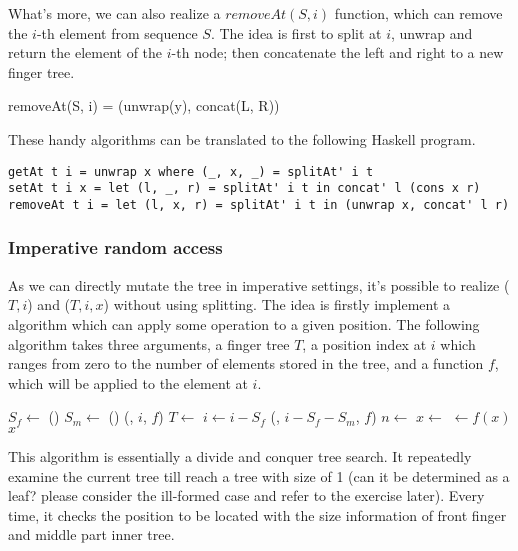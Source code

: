 \documentclass[UTF8]{article}
\begin{document}
What's more, we can also realize a $removeAt(S, i)$ function, which can remove the
$i$-th element from sequence $S$. The idea is first to split at $i$, unwrap and
return the element of the $i$-th node; then concatenate the left and right to a
new finger tree.

\be
removeAt(S, i) = (unwrap(y), concat(L, R))
\ee

These handy algorithms can be translated to the following Haskell program.

\lstset{language=Haskell}
\begin{lstlisting}
getAt t i = unwrap x where (_, x, _) = splitAt' i t
setAt t i x = let (l, _, r) = splitAt' i t in concat' l (cons x r)
removeAt t i = let (l, x, r) = splitAt' i t in (unwrap x, concat' l r)
\end{lstlisting}

\subsubsection{Imperative random access}
As we can directly mutate the tree in imperative settings, it's possible to
realize ($T, i$) and ($T, i, x$) without
using splitting. The idea is firstly implement a algorithm which can
apply some operation to a given position. The following algorithm takes
three arguments, a finger tree $T$, a position index at $i$ which ranges from
zero to the number of elements stored in the tree, and a function $f$,
which will be applied to the element at $i$.

\begin{algorithmic}
    \State $S_f \gets $ ()
    \State $S_m \gets $ ()
      \State \Return {}(, $i$, $f$)
      \State $T \gets$ 
      \State $i \gets i - S_f$
    \Else
      \State \Return {}(, $i - S_f - S_m$, $f$)
    \EndIf
  \EndWhile
  \State $n \gets$ 
  \State $x \gets$ 
  \State {} $\gets f(x)$
  \State \Return $x$
\EndFunction
\end{algorithmic}

This algorithm is essentially a divide and conquer tree search. It repeatedly
examine the current tree till reach a tree with size of 1 (can it be determined
as a leaf? please consider the ill-formed case and refer to the exercise later).
Every time, it checks the position to be located with the size information of
front finger and middle part inner tree.
\end{document}
